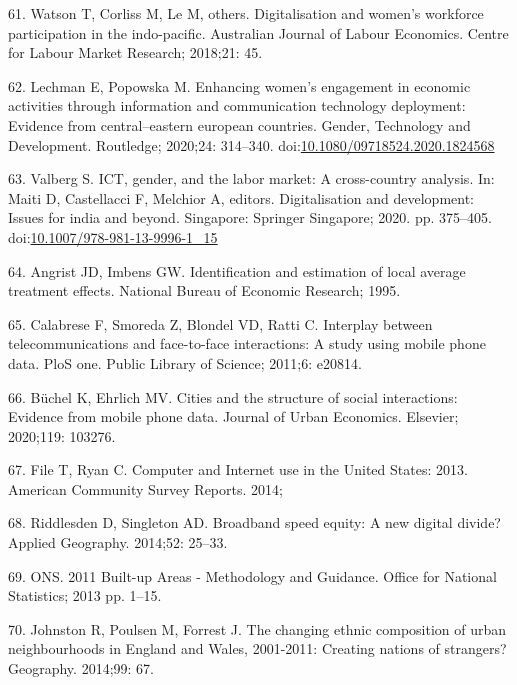 \documentclass[10pt,letterpaper]{article}
\begin{document}
\leavevmode\hypertarget{ref-watson2018digitalisation}{}%
61. Watson T, Corliss M, Le M, others. Digitalisation and women's
workforce participation in the indo-pacific. Australian Journal of
Labour Economics. Centre for Labour Market Research; 2018;21: 45.

\leavevmode\hypertarget{ref-Lechman2020}{}%
62. Lechman E, Popowska M. Enhancing women's engagement in economic
activities through information and communication technology deployment:
Evidence from central--eastern european countries. Gender, Technology
and Development. Routledge; 2020;24: 314--340.
doi:\href{https://doi.org/10.1080/09718524.2020.1824568}{10.1080/09718524.2020.1824568}

\leavevmode\hypertarget{ref-Valberg2020}{}%
63. Valberg S. ICT, gender, and the labor market: A cross-country
analysis. In: Maiti D, Castellacci F, Melchior A, editors.
Digitalisation and development: Issues for india and beyond. Singapore:
Springer Singapore; 2020. pp. 375--405.
doi:\href{https://doi.org/10.1007/978-981-13-9996-1_15}{10.1007/978-981-13-9996-1\_15}

\leavevmode\hypertarget{ref-angrist1995identification}{}%
64. Angrist JD, Imbens GW. Identification and estimation of local
average treatment effects. National Bureau of Economic Research; 1995.

\leavevmode\hypertarget{ref-calabrese2011interplay}{}%
65. Calabrese F, Smoreda Z, Blondel VD, Ratti C. Interplay between
telecommunications and face-to-face interactions: A study using mobile
phone data. PloS one. Public Library of Science; 2011;6: e20814.

\leavevmode\hypertarget{ref-buchel2020cities}{}%
66. Büchel K, Ehrlich MV. Cities and the structure of social
interactions: Evidence from mobile phone data. Journal of Urban
Economics. Elsevier; 2020;119: 103276.

\leavevmode\hypertarget{ref-file_computer_2014}{}%
67. File T, Ryan C. Computer and Internet use in the United States:
2013. American Community Survey Reports. 2014;

\leavevmode\hypertarget{ref-riddlesden_broadband_2014}{}%
68. Riddlesden D, Singleton AD. Broadband speed equity: A new digital
divide? Applied Geography. 2014;52: 25--33.

\leavevmode\hypertarget{ref-ons2013}{}%
69. ONS. 2011 Built-up Areas - Methodology and Guidance. Office for
National Statistics; 2013 pp. 1--15.

\leavevmode\hypertarget{ref-johnston_changing_2014}{}%
70. Johnston R, Poulsen M, Forrest J. The changing ethnic composition of
urban neighbourhoods in England and Wales, 2001-2011: Creating nations
of strangers? Geography. 2014;99: 67.
\end{document}
